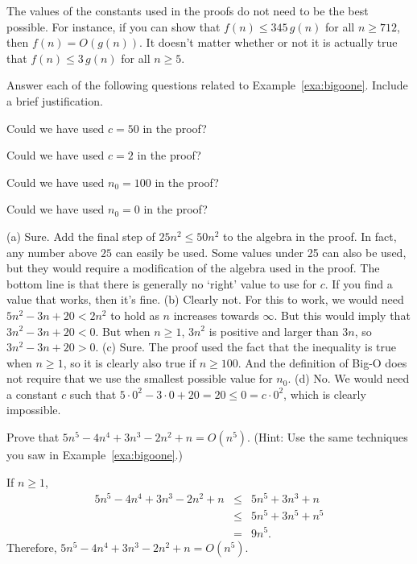 \begin{rem}
The values of the constants used in the proofs do not need to be the best possible. 
For instance, if you can show that $f(n)\leq 345\, g(n)$ for all $n\geq 712$, then $f(n)=O(g(n))$.
It doesn't matter whether or not it is actually true that 
$f(n)\leq 3\, g(n)$ for all $n\geq 5$.
\end{rem}

\begin{ques}
Answer each of the following questions related to Example~\ref{exa:bigoone}.  
Include a brief justification.
\begin{lenum}
\item
Could we have used $c=50$ in the proof?

\noindent
\answerlinetwo
\item
Could we have used $c=2$ in the proof?

\noindent
\answerlinetwo
\item
Could we have used $n_0=100$ in the proof?

\noindent
\answerlinetwo
\item
Could we have used $n_0=0$ in the proof?

\noindent
\answerlinetwo
\end{lenum}
\begin{answer}
(a) Sure.  Add the final step of $25n^2\leq 50n^2$ to the algebra in the proof.
In fact, any number above $25$ can easily be used.
Some values under 25 can also be used, but they would require a modification
of the algebra used in the proof.  
The bottom line is that there is generally no `right' value to
use for $c$.  If you find a value that works, then it's fine.
(b)  Clearly not.  For this to work, we would need
$5n^2-3n+20<2n^2$ to hold as $n$ increases towards $\infty$.
But this would imply that $3n^2-3n+20<0$.
But when $n\geq 1$, $3n^2$ is positive and larger than $3n$, so 
$3n^2-3n+20>0$.
(c) Sure.  The proof used the fact that the inequality is true when $n\geq 1$,
so it is clearly also true if $n\geq 100$.  And the definition of Big-O does
not require that we use the smallest possible value for $n_0$.
(d) No.  We would need a constant $c$ such that $5\cdot 0^2-3\cdot 0 + 20 = 20\leq 0= c\cdot 0^2$,
which is clearly impossible.
\end{answer}
\end{ques}

\newpage %

\begin{exer}\label{exer:firstbigoh}
Prove that $5n^{5} -4n^4 + 3n^3 - 2n^2 +n=O(n^5)$.
(Hint: Use the same techniques you saw in Example~\ref{exa:bigoone}.)

\vspace*{3in}
\begin{answer}
If $n\geq 1$,
\begin{eqnarray*} 
5n^{5} -4n^4 + 3n^3 - 2n^2 +n
&\leq&5n^{5} + 3n^3 +n\\
&\leq&5n^{5} + 3n^5 +n^5\\
&=&9n^5.
\end{eqnarray*}
Therefore, $5n^{5} -4n^4 + 3n^3 - 2n^2 +n=O(n^5)$.
\end{answer}
\end{exer}

